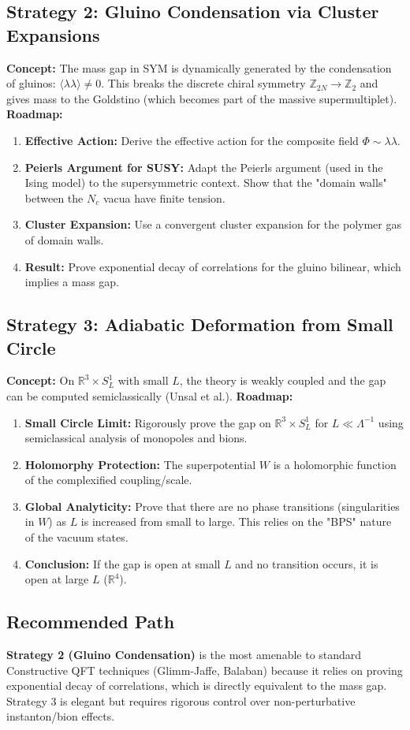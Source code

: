 \subsection{Strategy 2: Gluino Condensation via Cluster Expansions}
\textbf{Concept:} The mass gap in SYM is dynamically generated by the condensation of gluinos: $\langle \lambda \lambda \rangle \neq 0$. This breaks the discrete chiral symmetry $\mathbb{Z}_{2N} \to \mathbb{Z}_2$ and gives mass to the Goldstino (which becomes part of the massive supermultiplet).
\textbf{Roadmap:}
\begin{enumerate}
    \item \textbf{Effective Action:} Derive the effective action for the composite field $\Phi \sim \lambda \lambda$.
    \item \textbf{Peierls Argument for SUSY:} Adapt the Peierls argument (used in the Ising model) to the supersymmetric context. Show that the "domain walls" between the $N_c$ vacua have finite tension.
    \item \textbf{Cluster Expansion:} Use a convergent cluster expansion for the polymer gas of domain walls.
    \item \textbf{Result:} Prove exponential decay of correlations for the gluino bilinear, which implies a mass gap.
\end{enumerate}

\subsection{Strategy 3: Adiabatic Deformation from Small Circle}
\textbf{Concept:} On $\mathbb{R}^3 \times S^1_L$ with small $L$, the theory is weakly coupled and the gap can be computed semiclassically (Unsal et al.).
\textbf{Roadmap:}
\begin{enumerate}
    \item \textbf{Small Circle Limit:} Rigorously prove the gap on $\mathbb{R}^3 \times S^1_L$ for $L \ll \Lambda^{-1}$ using semiclassical analysis of monopoles and bions.
    \item \textbf{Holomorphy Protection:} The superpotential $W$ is a holomorphic function of the complexified coupling/scale.
    \item \textbf{Global Analyticity:} Prove that there are no phase transitions (singularities in $W$) as $L$ is increased from small to large. This relies on the "BPS" nature of the vacuum states.
    \item \textbf{Conclusion:} If the gap is open at small $L$ and no transition occurs, it is open at large $L$ ($\mathbb{R}^4$).
\end{enumerate}

\subsection{Recommended Path}
\textbf{Strategy 2 (Gluino Condensation)} is the most amenable to standard Constructive QFT techniques (Glimm-Jaffe, Balaban) because it relies on proving exponential decay of correlations, which is directly equivalent to the mass gap. Strategy 3 is elegant but requires rigorous control over non-perturbative instanton/bion effects.



